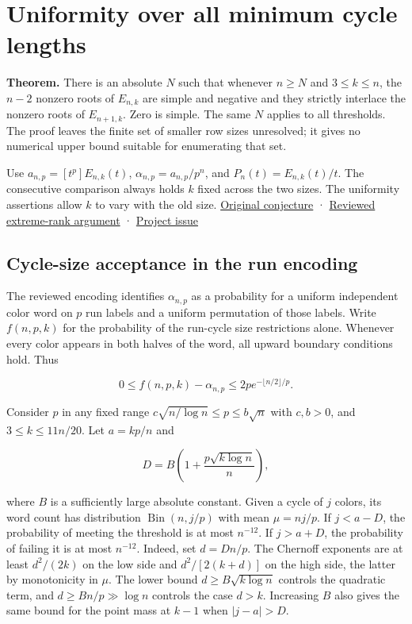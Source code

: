 \documentclass[11pt]{article}
\begin{document}
\section{Uniformity over all minimum cycle lengths}

\textbf{Theorem.} There is an absolute $N$ such that whenever $n\ge N$ and $3\le k\le n$, the $n-2$ nonzero roots of $E_{n,k}$ are simple and negative and they strictly interlace the nonzero roots of $E_{n+1,k}$. Zero is simple. The same $N$ applies to all thresholds. The proof leaves the finite set of smaller row sizes unresolved; it gives no numerical upper bound suitable for enumerating that set.

Use $a_{n,p}=[t^p]E_{n,k}(t)$, $\alpha_{n,p}=a_{n,p}/p^n$, and $P_n(t)=E_{n,k}(t)/t$. The consecutive comparison always holds $k$ fixed across the two sizes. The uniformity assertions allow $k$ to vary with the old size. \href{https://www.symmetricfunctions.com/realRootedOpenProblems.htm\#conjLongCycleExcedances}{Original conjecture} · \href{https://github.com/ProgramComputer/open-math-research/pull/7}{Reviewed extreme-rank argument} · \href{https://github.com/ProgramComputer/open-math-research/issues/4}{Project issue}

\subsection{Cycle-size acceptance in the run encoding}

The reviewed encoding identifies $\alpha_{n,p}$ as a probability for a uniform independent color word on $p$ run labels and a uniform permutation of those labels. Write $f(n,p,k)$ for the probability of the run-cycle size restrictions alone. Whenever every color appears in both halves of the word, all upward boundary conditions hold. Thus

\[
0\le f(n,p,k)-\alpha_{n,p}
 \le 2p e^{-\lfloor n/2\rfloor/p}.
\tag{U.1}
\]

Consider $p$ in any fixed range $c\sqrt{n/\log n}\le p\le b\sqrt n$ with $c,b>0$, and $3\le k\le 11 n/20$. Let $a=kp/n$ and

\[
D=B\left(1+\frac{p\sqrt{k\log n}}n\right),
\]

where $B$ is a sufficiently large absolute constant. Given a cycle of $j$ colors, its word count has distribution $\operatorname{Bin}(n,j/p)$ with mean $\mu=nj/p$. If $j<a-D$, the probability of meeting the threshold is at most $n^{-12}$. If $j>a+D$, the probability of failing it is at most $n^{-12}$. Indeed, set $d=Dn/p$. The Chernoff exponents are at least $d^2/(2k)$ on the low side and $d^2/[2(k+d)]$ on the high side, the latter by monotonicity in $\mu$. The lower bound $d\ge B\sqrt{k\log n}$ controls the quadratic term, and $d\ge Bn/p\gg\log n$ controls the case $d>k$. Increasing $B$ also gives the same bound for the point mass at $k-1$ when $|j-a|>D$.
\end{document}
